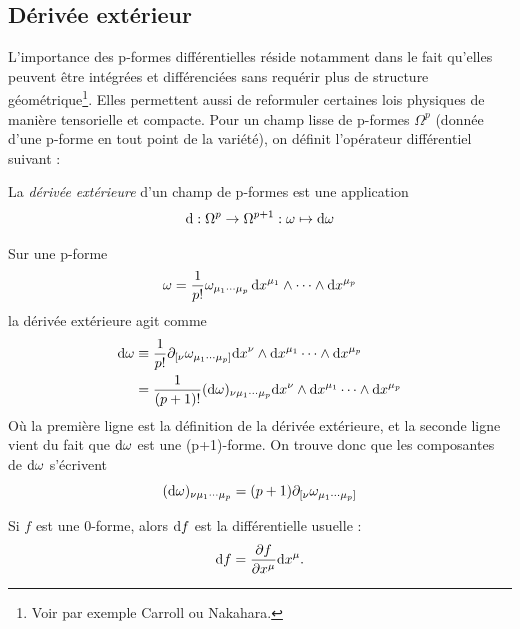 \subsection{Dérivée extérieur}
L'importance des p-formes différentielles réside notamment dans le fait qu'elles peuvent être intégrées et différenciées sans requérir plus de structure géométrique\footnote{Voir par exemple Carroll ou Nakahara.}. Elles permettent aussi de reformuler certaines lois physiques de manière tensorielle et compacte. Pour un champ lisse de p-formes $\Omega^p$ (donnée d'une p-forme en tout point de la variété), on définit l'opérateur différentiel suivant :
\begin{theoremframe}
    \begin{defi}
        La \emph{dérivée extérieure} d'un champ de p-formes est une application
        \begin{equation}
            \mathrm{d} :\Omega^p \to \Omega^{p+1}:\omega \mapsto \mathrm{d} \omega 
        \end{equation}
    \end{defi}
\end{theoremframe}
Sur une p-forme 
\begin{equation}
     \omega = \frac{1}{p!}\omega_{\mu_1 \cdots \mu_p}\, \mathrm{d} x^{\mu_1}\wedge \cdots \wedge \mathrm{d} x^{\mu_p}
\end{equation}
la dérivée extérieure agit comme
\begin{align}
    \mathrm{d} \omega  &\equiv \frac{1}{p!}\partial_{[{\nu }}\omega _{\mu_1 \cdots \mu_p]}\mathrm{d} x^{\nu}\wedge \mathrm{d} x^{\mu_1}\cdots \wedge \mathrm{d} x^{\mu_p}\\
    &= \frac{1}{(p+1)!}(\mathrm{d} \omega )_{\nu \mu_1 \cdots \mu_p}\mathrm{d} x^{\nu}\wedge \mathrm{d} x^{\mu_1}\cdots \wedge \mathrm{d} x^{\mu_p}
\end{align}
Où la première ligne est la définition de la dérivée extérieure, et la seconde ligne vient du fait que $\mathrm{d} \omega $ est une (p+1)-forme. On trouve donc que les composantes de $\mathrm{d} \omega $ s'écrivent
\begin{equation}
    (\mathrm{d} \omega )_{\nu \mu_1 \cdots \mu_p} = (p+1)\partial_{[{\nu }}\omega _{\mu_1 \cdots \mu_p]}
\end{equation}
\begin{rmk}
    Si $f $ est une 0-forme, alors $\mathrm{d} f$ est la différentielle usuelle :
    \begin{equation} 
    \mathrm{d} f = \frac{\partial f}{\partial x^{\mu}}\mathrm{d} x^{\mu}.
    \end{equation}
\end{rmk}
\cutebreak
